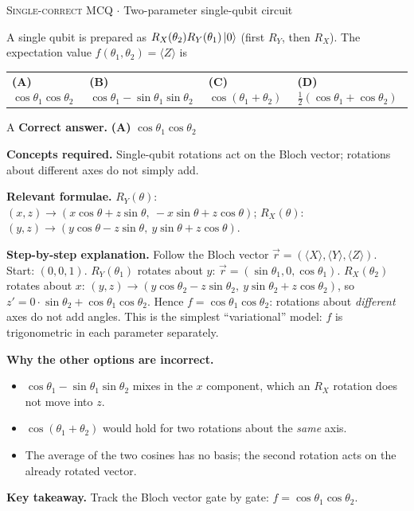 \documentclass[11pt,a4paper]{article}
\newcommand{\optlabel}[1]{\textbf{(#1)}}
\newcommand{\correctlabel}[1]{\textcolor{okgreen}{\textbf{(#1)}\,\ding{51}}}
\newenvironment{qitem}[1]{\begin{list}{}{\setlength{\leftmargin}{3.3em}\setlength{\labelwidth}{3.1em}%
  \setlength{\labelsep}{0.2em}\setlength{\topsep}{3pt}\setlength{\parsep}{3pt}}\item[\textbf{Q.#1}\hfill]}{\end{list}}
\newcommand{\qsep}{\par\vspace{2pt}{\color{black!15}\hrule}\vspace{4pt}}
\newcommand{\qmeta}[2]{{\footnotesize\color{black!60}\textsc{#1} \;$\cdot$\; #2}\par}
\begin{document}
\begin{qitem}{34}
\qmeta{Single-correct MCQ}{Two-parameter single-qubit circuit}
A single qubit is prepared as $R_X(\theta_2)R_Y(\theta_1)\ket0$ (first $R_Y$, then $R_X$). The expectation value
$f(\theta_1, \theta_2) = \langle Z\rangle$ is
\par\smallskip\noindent\begin{tabularx}{\linewidth}{@{}*{4}{L}@{}}
\correctlabel{A}\,$\cos\theta_1\cos\theta_2$ & \optlabel{B}\,$\cos\theta_1 - \sin\theta_1\sin\theta_2$ & \optlabel{C}\,$\cos(\theta_1 + \theta_2)$ & \optlabel{D}\,$\tfrac12(\cos\theta_1 + \cos\theta_2)$
\end{tabularx}
\end{qitem}
\begin{solbox}{A}
\textbf{\color{brand}Correct answer.} \textcolor{okgreen}{\textbf{(A)}} $\cos\theta_1\cos\theta_2$

\textbf{\color{brand}Concepts required.} Single-qubit rotations act on the Bloch vector; rotations about different axes do not simply add.

\textbf{\color{brand}Relevant formulae.} $R_Y(\theta)$: $(x, z) \to (x\cos\theta + z\sin\theta,\ -x\sin\theta + z\cos\theta)$; $R_X(\theta)$: $(y, z) \to (y\cos\theta - z\sin\theta,\ y\sin\theta + z\cos\theta)$.

\textbf{\color{brand}Step-by-step explanation.} Follow the Bloch vector $\vec r = (\langle X\rangle, \langle Y\rangle, \langle Z\rangle)$. Start: $(0, 0, 1)$.
$R_Y(\theta_1)$ rotates about $y$: $\vec r = (\sin\theta_1, 0, \cos\theta_1)$.
$R_X(\theta_2)$ rotates about $x$: $(y, z) \to (y\cos\theta_2 - z\sin\theta_2,\ y\sin\theta_2 + z\cos\theta_2)$, so
$z' = 0\cdot\sin\theta_2 + \cos\theta_1\cos\theta_2$. Hence $f = \cos\theta_1\cos\theta_2$: rotations about \emph{different} axes do
not add angles. This is the simplest ``variational'' model: $f$ is trigonometric in each parameter separately.

\textbf{\color{brand}Why the other options are incorrect.}
\begin{itemize}[leftmargin=2.4em, itemsep=1pt, topsep=2pt]
\item[\textbf{(B)}] $\cos\theta_1 - \sin\theta_1\sin\theta_2$ mixes in the $x$ component, which an $R_X$ rotation does not move into $z$.
\item[\textbf{(C)}] $\cos(\theta_1 + \theta_2)$ would hold for two rotations about the \emph{same} axis.
\item[\textbf{(D)}] The average of the two cosines has no basis; the second rotation acts on the already rotated vector.
\end{itemize}
\textbf{\color{brand}Key takeaway.} Track the Bloch vector gate by gate: $f = \cos\theta_1\cos\theta_2$.
\end{solbox}
\qsep
\end{document}
